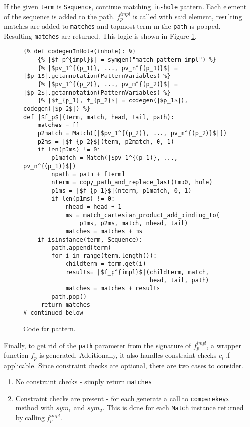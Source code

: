 If the given \texttt{term} is \texttt{Sequence}, continue matching \texttt{in-hole} pattern. Each element of the sequence is added to the path, $f_p^{impl}$ is called with said element, resulting matches are added to \texttt{matches} and topmost term in the \texttt{path} is popped. Resulting \texttt{matches} are returned. This logic is shown in Figure \ref{pat-inhole-1}.

\begin{figure}[H]
\begin{verbatim}
{% def codegenInHole(inhole): %}
	{% |$f_p^{impl}$| = symgen("match_pattern_impl") %}
	{% |$pv_1^{(p_1)}, ..., pv_n^{(p_1)}$| = |$p_1$|.getannotation(PatternVariables) %}
	{% |$pv_1^{(p_2)}, ..., pv_m^{(p_2)}$| = |$p_2$|.getannotation(PatternVariables) %}
	{% |$f_{p_1}, f_{p_2}$| = codegen(|$p_1$|), codegen(|$p_2$|) %}
def |$f_p$|(term, match, head, tail, path):
	matches = []
	p2match = Match([|$pv_1^{(p_2)}, ..., pv_m^{(p_2)}$|])
	p2ms = |$f_{p_2}$|(term, p2match, 0, 1)
	if len(p2ms) != 0:
		p1match = Match(|$pv_1^{(p_1)}, ..., pv_n^{(p_1)}$|)
		npath = path + [term]
		nterm = copy_path_and_replace_last(tmp0, hole)
		p1ms = |$f_{p_1}$|(nterm, p1match, 0, 1)
		if len(p1ms) != 0:
			nhead = head + 1
			ms = match_cartesian_product_add_binding_to(
				p1ms, p2ms, match, nhead, tail)
			matches = matches + ms
	if isinstance(term, Sequence):
		path.append(term)
		for i in range(term.length()):
			childterm = term.get(i)
			results= |$f_p^{impl}$|(childterm, match, 
								    head, tail, path)
			matches = matches + results 
		path.pop()
	 return matches 
# continued below
\end{verbatim} 
\caption{Code for \PatternInHoleNoArg \space pattern.}
\label{pat-inhole-1}
\end{figure}

Finally, to get rid of the \texttt{path} parameter from the signature of $f_p^{impl}$, a wrapper function $f_p$ is generated. Additionally, it also handles constraint checks $c_i$ if applicable. Since constraint checks are optional, there are two cases to consider.

\begin{enumerate}
\item No constraint checks - simply return \texttt{matches}
\item Constraint checks are present - for each \PatternCheckConstraint \space generate a call to \texttt{comparekeys} method with $sym_1$ and $sym_2$. This is done for each \texttt{Match} instance returned by calling $f_p^{impl}$.
\end{enumerate}

